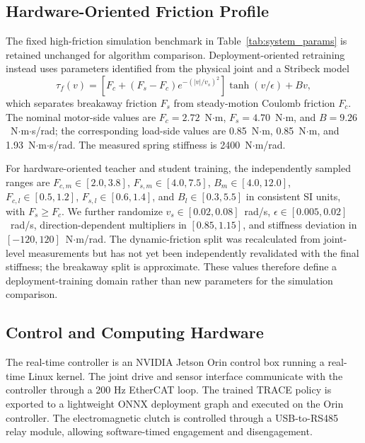 \documentclass[letterpaper,journal]{IEEEtran}
\begin{document}
\subsection{Hardware-Oriented Friction Profile}

The fixed high-friction simulation benchmark in Table~\ref{tab:system_params} is retained unchanged for algorithm comparison. Deployment-oriented retraining instead uses parameters identified from the physical joint and a Stribeck model
\begin{equation}
\tau_f(v)=\left[F_c+(F_s-F_c)e^{-(|v|/v_s)^2}\right]\tanh(v/\epsilon)+Bv,
\label{eq:hardware_stribeck}
\end{equation}
which separates breakaway friction $F_s$ from steady-motion Coulomb friction $F_c$. The nominal motor-side values are $F_c=2.72$~N$\cdot$m, $F_s=4.70$~N$\cdot$m, and $B=9.26$~N$\cdot$m$\cdot$s/rad; the corresponding load-side values are 0.85~N$\cdot$m, 0.85~N$\cdot$m, and 1.93~N$\cdot$m$\cdot$s/rad. The measured spring stiffness is 2400~N$\cdot$m/rad.

For hardware-oriented teacher and student training, the independently sampled ranges are $F_{c,m}\in[2.0,3.8]$, $F_{s,m}\in[4.0,7.5]$, $B_m\in[4.0,12.0]$, $F_{c,l}\in[0.5,1.2]$, $F_{s,l}\in[0.6,1.4]$, and $B_l\in[0.3,5.5]$ in consistent SI units, with $F_s\geq F_c$. We further randomize $v_s\in[0.02,0.08]$~rad/s, $\epsilon\in[0.005,0.02]$~rad/s, direction-dependent multipliers in $[0.85,1.15]$, and stiffness deviation in $[-120,120]$~N$\cdot$m/rad. The dynamic-friction split was recalculated from joint-level measurements but has not yet been independently revalidated with the final stiffness; the breakaway split is approximate. These values therefore define a deployment-training domain rather than new parameters for the simulation comparison.

\subsection{Control and Computing Hardware}

The real-time controller is an NVIDIA Jetson Orin control box running a real-time Linux kernel. The joint drive and sensor interface communicate with the controller through a 200 Hz EtherCAT loop. The trained TRACE policy is exported to a lightweight ONNX deployment graph and executed on the Orin controller. The electromagnetic clutch is controlled through a USB-to-RS485 relay module, allowing software-timed engagement and disengagement.
\end{document}
